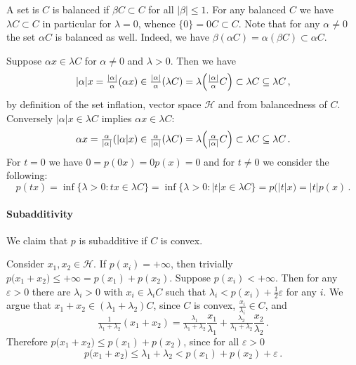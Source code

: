 \documentclass[a4paper]{article}
\newcommand{\Hcal}{\mathcal{H}}
\begin{document}
A set is $C$ is balanced if $\beta C \subset C$ for all $\lvert \beta \rvert \leq 1$.
For any balanced $C$ we have $\lambda C \subset C$ in particular for $\lambda = 0$,
whence $\{0\} = 0 C \subset C$. Note that for any $\alpha \neq 0$ the set $\alpha C$
is balanced as well. Indeed, we have $\beta (\alpha C) = \alpha (\beta C) \subset
\alpha C$.

Suppose $\alpha x \in \lambda C$ for $\alpha \neq 0$ and $\lambda > 0$. Then we have
\begin{equation*}
  \lvert \alpha \rvert x
    = \tfrac{\lvert \alpha \rvert}\alpha (\alpha x)
    \in \tfrac{\lvert \alpha \rvert}\alpha (\lambda C)
    = \lambda \Bigl( \tfrac{\lvert \alpha \rvert}\alpha C \Bigr)
    \subset \lambda C
    \subseteq \lambda C
    \,,
\end{equation*}
by definition of the set inflation, vector space $\Hcal$ and from balancedness of
$C$. Conversely $\lvert \alpha \rvert x \in \lambda C$ implies $\alpha x \in \lambda
C$:
\begin{equation*}
  \alpha x
    = \tfrac\alpha{\lvert \alpha \rvert} (\lvert \alpha \rvert x)
    \in \tfrac\alpha{\lvert \alpha \rvert} (\lambda C)
    = \lambda \Bigl( \tfrac\alpha{\lvert \alpha \rvert} C \Bigr)
    \subset \lambda C
    \subseteq \lambda C
    \,.
\end{equation*}
For $t = 0$ we have $0 = p(0 x) = 0 p(x) = 0$ and for $t\neq 0$ we consider the
following:
\begin{equation*}
  p(t x)
    = \inf\{\lambda > 0\colon t x \in \lambda C\}
    = \inf\{\lambda > 0\colon \lvert t \rvert x \in \lambda C\}
    = p\bigl( \lvert t \rvert x \bigr) = \lvert t \rvert p(x)
    \,.
\end{equation*}


\paragraph{Subadditivity} %
\label{par:subadditivity}

We claim that $p$ is subadditive if $C$ is convex.

Consider $x_1, x_2 \in \Hcal$. If $p(x_i) = +\infty$, then trivially $p\bigl( x_1
+ x_2 \bigr) \leq +\infty =  p(x_1) + p(x_2)$. Suppose $p(x_i) < + \infty$. Then
for any $\varepsilon > 0$ there are $\lambda_i > 0$ with $x_i \in \lambda_i C$ such
that $\lambda_i < p(x_i) + \tfrac12\varepsilon$ for any $i$. We argue that $x_1 + x_2
\in (\lambda_1 + \lambda_2) C$, since $C$ is convex, $\tfrac{x_i}{\lambda_i} \in C$,
and
\begin{equation*}
  \tfrac1{\lambda_1 + \lambda_2} (x_1 + x_2)
    = \tfrac{\lambda_1}{\lambda_1 + \lambda_2} \frac{x_1}{\lambda_1}
      + \tfrac{\lambda_2}{\lambda_1 + \lambda_2} \frac{x_2}{\lambda_2}
    \,.
\end{equation*}
Therefore $p\bigl( x_1 + x_2 \bigr) \leq p(x_1) + p(x_2)$, since for all $\varepsilon
> 0$
\begin{equation*}
  p\bigl( x_1 + x_2 \bigr)
    \leq \lambda_1 + \lambda_2
    < p(x_1) + p(x_2) + \varepsilon
    \,.
\end{equation*}
\end{document}
